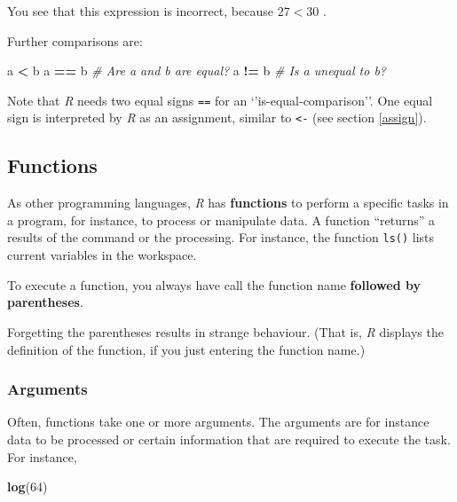 \documentclass[
]{scrartcl}
\makeatletter
\newenvironment{Shaded}{\begin{snugshade}}{\end{snugshade}}
\newcommand{\CommentTok}[1]{\textcolor[rgb]{0.56,0.35,0.01}{\textit{#1}}}
\newcommand{\DecValTok}[1]{\textcolor[rgb]{0.00,0.00,0.81}{#1}}
\newcommand{\FunctionTok}[1]{\textcolor[rgb]{0.13,0.29,0.53}{\textbf{#1}}}
\newcommand{\NormalTok}[1]{#1}
\newcommand{\SpecialCharTok}[1]{\textcolor[rgb]{0.81,0.36,0.00}{\textbf{#1}}}
\newenvironment{kframe}{%
\medskip{}
\setlength{\fboxsep}{.8em}
 \def\at@end@of@kframe{}%
 \ifinner\ifhmode%
  \def\at@end@of@kframe{\end{minipage}}%
  \begin{minipage}{\columnwidth}%
 \fi\fi%
 \def\FrameCommand##1{\hskip\@totalleftmargin \hskip-\fboxsep
 \colorbox{shadecolor}{##1}\hskip-\fboxsep
     \hskip-\linewidth \hskip-\@totalleftmargin \hskip\columnwidth}%
 \MakeFramed {\advance\hsize-\width
   \@totalleftmargin\z@ \linewidth\hsize
   \@setminipage}}%
 {\par\unskip\endMakeFramed%
 \at@end@of@kframe}
\newenvironment{rmdblock}[1]
  {
  \begin{itemize}
  \renewcommand{\labelitemi}{
    \raisebox{-.7\height}[0pt][0pt]{
      {\setkeys{Gin}{width=3em,keepaspectratio}\texttt{[image: images/\#1]}}
    }
  }
  \setlength{\fboxsep}{1em}
  \begin{kframe}
  \item
  }
  {
  \end{kframe}
  \end{itemize}
  }
\newenvironment{important}
    {\begin{rmdblock}{hint}}
    {\end{rmdblock}}
\makeatother
\begin{document}
You see that this expression is incorrect, because \(27<30\) .

Further comparisons are:

\begin{Shaded}
\begin{Highlighting}[]
\NormalTok{a }\SpecialCharTok{\textless{}}\NormalTok{ b}
\NormalTok{a }\SpecialCharTok{==}\NormalTok{ b   }\CommentTok{\# Are a and b are equal?}
\NormalTok{a }\SpecialCharTok{!=}\NormalTok{ b   }\CommentTok{\# Is a unequal to b?}
\end{Highlighting}
\end{Shaded}

Note that \emph{R} needs two equal signs \texttt{==} for an `'is-equal-comparison''. One equal sign is interpreted by \emph{R} as an assignment, similar to \texttt{\textless{}-} (see section \ref{assign}).

\subsection{Functions}\label{functions}

As other programming languages, \emph{R} has \textbf{functions} to perform a specific tasks in a program, for instance, to process or manipulate data. A function ``returns'' a results of the command or the processing. For instance, the function \texttt{ls()} lists current variables in the workspace.

\begin{important}
To execute a function, you always have call the function name
\textbf{followed by parentheses}.

Forgetting the parentheses results in strange behaviour. (That is,
\emph{R} displays the definition of the function, if you just entering
the function name.)
\end{important}

\subsubsection{Arguments}\label{arguments}

Often, functions take one or more arguments. The arguments are for instance data to be processed or certain information that are required to execute the task. For instance,

\begin{Shaded}
\begin{Highlighting}[]
\FunctionTok{log}\NormalTok{(}\DecValTok{64}\NormalTok{)}
\end{Highlighting}
\end{Shaded}
\end{document}
